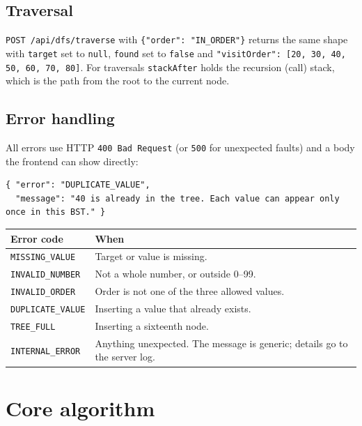 \documentclass[11pt,a4paper]{article}
\newcommand{\code}[1]{\texttt{#1}}
\begin{document}
\subsection{Traversal}

\code{POST /api/dfs/traverse} with \code{\{"order": "IN\_ORDER"\}} returns the same shape with
\code{target} set to \code{null}, \code{found} set to \code{false} and
\code{"visitOrder": [20, 30, 40, 50, 60, 70, 80]}. For traversals \code{stackAfter} holds the
recursion (call) stack, which is the path from the root to the current node.

\subsection{Error handling}

All errors use HTTP \code{400 Bad Request} (or \code{500} for unexpected faults) and a body the
frontend can show directly:

\begin{lstlisting}[style=json]
{ "error": "DUPLICATE_VALUE",
  "message": "40 is already in the tree. Each value can appear only once in this BST." }
\end{lstlisting}

\begin{tabularx}{\textwidth}{@{}l L@{}}
  \toprule
  \textbf{Error code} & \textbf{When} \\
  \midrule
  \code{MISSING\_VALUE}  & Target or value is missing. \\
  \code{INVALID\_NUMBER} & Not a whole number, or outside 0--99. \\
  \code{INVALID\_ORDER}  & Order is not one of the three allowed values. \\
  \code{DUPLICATE\_VALUE} & Inserting a value that already exists. \\
  \code{TREE\_FULL}      & Inserting a sixteenth node. \\
  \code{INTERNAL\_ERROR} & Anything unexpected. The message is generic; details go to the server log. \\
  \bottomrule
\end{tabularx}

\section{Core algorithm}
\end{document}
